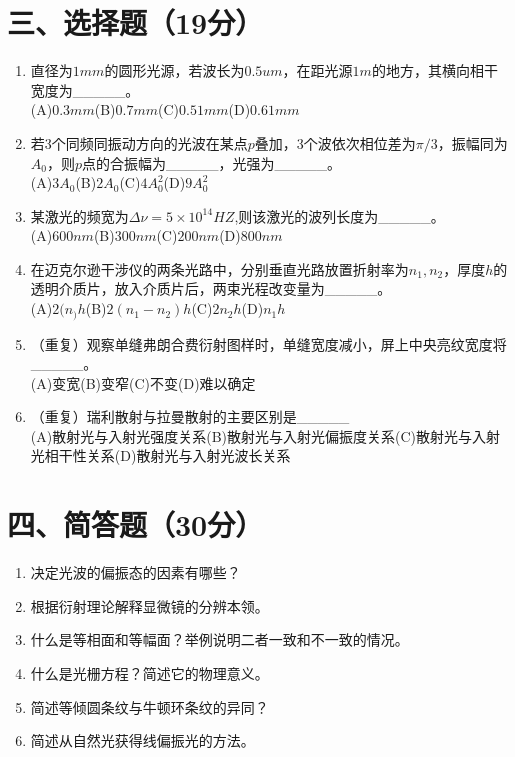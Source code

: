 \documentclass[12pt, a4paper]{article}
\theoremstyle{solution}
\begin{document}
\section*{三、选择题（19分）}
\begin{enumerate}
    \item 直径为$1mm$的圆形光源，若波长为$0.5um$，在距光源$1m$的地方，其横向相干宽度为\_\_\_\_\_。\\(A)$0.3mm$\quad (B)$0.7mm$\quad (C)$0.51mm$\quad (D)$0.61mm$
    \item 若3个同频同振动方向的光波在某点$p$叠加，3个波依次相位差为$\pi/3$，振幅同为$A_0$，则$p$点的合振幅为\_\_\_\_\_，光强为\_\_\_\_\_。\\(A)$3A_0$\quad (B)$2A_0$\quad (C)$4A_0^2$\quad (D)$9A_0^2$
    \item 某激光的频宽为$\Delta \nu =5\times10^{14}HZ$,则该激光的波列长度为\_\_\_\_\_。\\(A)$600nm$\quad (B)$300nm$\quad (C)$200nm$\quad (D)$800nm$
    \item 在迈克尔逊干涉仪的两条光路中，分别垂直光路放置折射率为$n_1,n_2$，厚度$h$的透明介质片，放入介质片后，两束光程改变量为\_\_\_\_\_。\\(A)$2(n_)h$\quad (B)$2(n_1-n_2)h$\quad (C)$2n_2h$\quad (D)$n_1h$
    \item （重复）观察单缝弗朗合费衍射图样时，单缝宽度减小，屏上中央亮纹宽度将\_\_\_\_\_。\\(A)变宽\quad (B)变窄\quad (C)不变\quad (D)难以确定
    \item （重复）瑞利散射与拉曼散射的主要区别是\_\_\_\_\_\\(A)散射光与入射光强度关系\quad(B)散射光与入射光偏振度关系\quad (C)散射光与入射光相干性关系\quad (D)散射光与入射光波长关系
\end{enumerate}
\section*{四、简答题（30分）}
\begin{enumerate}
    \item 决定光波的偏振态的因素有哪些？
    \item 根据衍射理论解释显微镜的分辨本领。
    \item 什么是等相面和等幅面？举例说明二者一致和不一致的情况。
    \item 什么是光栅方程？简述它的物理意义。
    \item 简述等倾圆条纹与牛顿环条纹的异同？
    \item 简述从自然光获得线偏振光的方法。
\end{enumerate}
\end{document}
